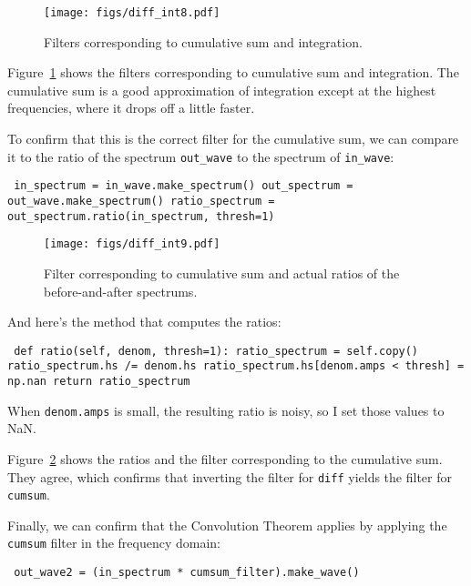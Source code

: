 \documentclass[12pt]{book} \usepackage[width=5.5in,height=8.5in, hmarginratio=3:2,vmarginratio=1:1]{geometry}
\begin{document}
\begin{figure} 

\centerline{\texttt{[image: figs/diff\_int8.pdf]}} \caption{Filters corresponding to cumulative sum and integration.} \label{fig.diff_int8} \end{figure} 

Figure~\ref{fig.diff_int8} shows the filters corresponding to cumulative sum and integration. The cumulative sum is a good approximation of integration except at the highest frequencies, where it drops off a little faster. 

To confirm that this is the correct filter for the cumulative sum, we can compare it to the ratio of the spectrum \verb"out_wave" to the spectrum of \verb"in_wave": 

\begin{verbatim} in_spectrum = in_wave.make_spectrum() out_spectrum = out_wave.make_spectrum() ratio_spectrum = out_spectrum.ratio(in_spectrum, thresh=1) \end{verbatim} 

\begin{figure} 

\centerline{\texttt{[image: figs/diff\_int9.pdf]}} \caption{Filter corresponding to cumulative sum and actual ratios of the before-and-after spectrums.} \label{fig.diff_int9} \end{figure} 

And here's the method that computes the ratios: 

\begin{verbatim} def ratio(self, denom, thresh=1): ratio_spectrum = self.copy() ratio_spectrum.hs /= denom.hs ratio_spectrum.hs[denom.amps < thresh] = np.nan return ratio_spectrum \end{verbatim} 

When {\tt denom.amps} is small, the resulting ratio is noisy, so I set those values to NaN. 

Figure~\ref{fig.diff_int9} shows the ratios and the filter corresponding to the cumulative sum. They agree, which confirms that inverting the filter for {\tt diff} yields the filter for {\tt cumsum}. 

Finally, we can confirm that the Convolution Theorem applies by applying the {\tt cumsum} filter in the frequency domain: 

\begin{verbatim} out_wave2 = (in_spectrum * cumsum_filter).make_wave() \end{verbatim} 
\end{document}
